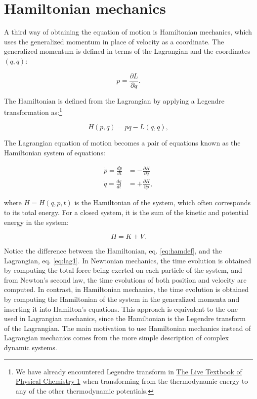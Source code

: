 \documentclass[
  9pt,
]{extbook}
\theoremstyle{definition}
\theoremstyle{definition}
\theoremstyle{definition}
\theoremstyle{remark}
\begin{document}
\hypertarget{hamiltonian-mechanics}{%
\section{Hamiltonian mechanics}\label{hamiltonian-mechanics}}

A third way of obtaining the equation of motion is Hamiltonian mechanics, which uses the generalized momentum in place of velocity as a coordinate. The generalized momentum is defined in terms of the Lagrangian and the coordinates \((q,\dot{q})\):

\begin{equation} 
p = \frac{\partial L}{\partial\dot{q}}.
\label{eq:ham1}
\end{equation}

The Hamiltonian is defined from the Lagrangian by applying a Legendre transformation as:\footnote{We have already encountered Legendre transform in \href{https://peverati.github.io/pchem1/Potentials.html\#thermpot}{The Live Textbook of Physical Chemistry 1} when transforming from the thermodynamic energy to any of the other thermodynamic potentials.}

\begin{equation} 
H(p,q) = p\dot{q} - L(q,\dot{q}),
\label{eq:ham2}
\end{equation}

The Lagrangian equation of motion becomes a pair of equations known as the Hamiltonian system of equations:

\begin{equation} 
\begin{aligned}
\dot{p}=\frac{dp}{dt} &= -\frac{\partial H}{\partial q} \\
\dot{q}=\frac{dq}{dt} &= +\frac{\partial H}{\partial p},
\end{aligned}
\label{eq:ham3}
\end{equation}

where \(H=H(q,p,t)\) is the Hamiltonian of the system, which often corresponds to its total energy. For a closed system, it is the sum of the kinetic and potential energy in the system:

\begin{equation}
H = K + V.
\label{eq:hamdef}
\end{equation}

Notice the difference between the Hamiltonian, eq. \eqref{eq:hamdef}, and the Lagrangian, eq. \eqref{eq:lag1}. In Newtonian mechanics, the time evolution is obtained by computing the total force being exerted on each particle of the system, and from Newton's second law, the time evolutions of both position and velocity are computed. In contrast, in Hamiltonian mechanics, the time evolution is obtained by computing the Hamiltonian of the system in the generalized momenta and inserting it into Hamilton's equations. This approach is equivalent to the one used in Lagrangian mechanics, since the Hamiltonian is the Legendre transform of the Lagrangian. The main motivation to use Hamiltonian mechanics instead of Lagrangian mechanics comes from the more simple description of complex dynamic systems.
\end{document}

